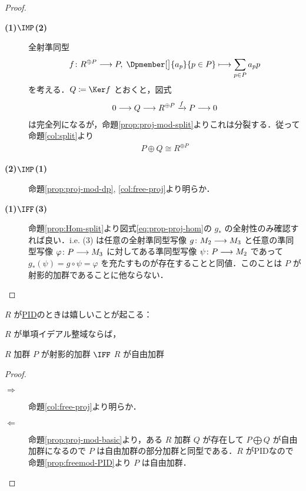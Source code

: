 \documentclass[algtopo_main]{subfiles}
\begin{document}
\begin{proof}
    \begin{description}
        \item[\textbf{(1)$\IMP$(2)}] 全射準同型
        \begin{align}
            f \colon R^{\oplus P} \lto P,\; \Dpmember[\big]{a_p}{p \in P} \lmto \sum_{p \in P} a_p p
        \end{align}
        を考える．$Q \coloneqq \Ker f$ とおくと，図式
        \begin{align}
            0 \longrightarrow Q \longrightarrow R^{\oplus P} \xrightarrow{f} P \longrightarrow 0
        \end{align}
        は完全列になるが，命題\ref{prop:proj-mod-split}よりこれは分裂する．従って命題\ref{col:split}より
        \begin{align}
            P \oplus Q \cong R^{\oplus P}
        \end{align}
        \item[\textbf{(2)$\IMP$(1)}] 命題\ref{prop:proj-mod-dp}, \ref{col:free-proj}より明らか．
        \item[\textbf{(1)$\IFF$(3)}] 命題\ref{prop:Hom-split}より図式\eqref{eq:prop-proj-hom}の $g_*$ の全射性のみ確認すれば良い．i.e. (3) は任意の全射準同型写像 $g \colon M_2 \longrightarrow M_3$ と任意の準同型写像 $\varphi \colon P \longrightarrow M_3$ に対してある準同型写像 $\psi\colon P \longrightarrow M_2$ であって
        $g_*(\psi) = g \circ \psi = \varphi$ を充たすものが存在することと同値．このことは $P$ が射影的加群であることに他ならない．
    \end{description}
\end{proof}

$R$ が\hyperref[def:PID]{PID}のときは嬉しいことが起こる：

\begin{mycol}[label=col:proj-PID]{}
    $R$ が単項イデアル整域ならば，
    
    $R$ 加群 $P$ が射影的加群 $\IFF$ $R$ が自由加群
\end{mycol}

\begin{proof}
    \begin{description}
        \item[\textbf{$\bm{\Longrightarrow}$}] 命題\ref{col:free-proj}より明らか．
        \item[\textbf{$\bm{\Longleftarrow}$}] 命題\ref{prop:proj-mod-basic}より，ある $R$ 加群 $Q$ が存在して $P \bigoplus Q$ が自由加群になるので $P$ は自由加群の部分加群と同型である．$R$ がPIDなので命題\ref{prop:freemod-PID}より $P$ は自由加群．
    \end{description}
\end{proof}
\end{document}
